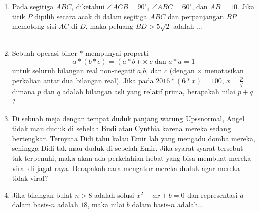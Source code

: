 \documentclass[12pt]{scrartcl}
\begin{document}
\begin{enumerate}[resume]
	\item Pada segitiga $ABC$, diketahui $\angle ACB = 90^\circ$, $\angle ABC = 60^\circ$, dan $AB=10$. Jika titik $P$ dipilih secara acak di dalam segitiga $ABC$ dan perpanjangan $BP$ memotong sisi $AC$ di $D$, maka peluang $BD > 5\sqrt{2}$ adalah ...\\
	\\
	
	\item Sebuah operasi biner $*$ mempunyai properti $$a*(b*c) = (a*b)\times c \text{  dan  } a*a = 1$$
	untuk seluruh bilangan real non-negatif $a$,$b$, dan $c$ (dengan $\times$ menotasikan perkalian antar dua bilangan real). Jika pada $2016*(6*x)=100$, $x = \frac{p}{q}$ dimana $p$ dan $q$ adalah bilangan asli yang relatif prima, berapakah nilai $p+q$?
	
	\item Di sebuah meja dengan tempat duduk panjang warung Upssnormal, Angel tidak mau duduk di sebelah Budi atau Cynthia karena mereka sedang bertengkar. Ternyata Didi tahu kalau Emir lah yang mengadu domba mereka, sehingga Didi tak mau duduk di sebelah Emir. Jika syarat-syarat tersebut tak terpenuhi, maka akan ada perkelahian hebat yang bisa membuat mereka viral di jagat raya. Berapakah cara mengatur mereka duduk agar mereka tidak viral?
	
	\item Jika bilangan bulat $n>8$ adalah solusi $x^2-ax+b=0$ dan representasi $a$ dalam basis-$n$ adalah $18$, maka nilai $b$ dalam basis-$n$ adalah...
	
	
\end{enumerate}
\end{document}
